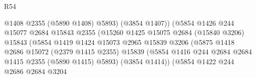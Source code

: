 \begin{lexlean}{R54}
\begin{coremodule}
                                              @1408
                                              @2355
                                              (@5890 @1408)
                                              @5893)
                                            (@3854 @1407))
                                          (@5854
                                            @1426
                                            @244
                                            @15077
                                            @2684
                                            @15843
                                            @2355
                                            (@15260
                                              @1425
                                              @15075
                                              @2684
                                              (@15840 @3206)
                                              @15843
                                              (@5854
                                                @1419
                                                @1424
                                                @15073
                                                @2965
                                                @15839
                                                @3206
                                                (@5875
                                                  @1418
                                                  @2686
                                                  @15072
                                                  (@2379 @1415 @2355)
                                                  @15839
                                                  (@5854
                                                    @1416
                                                    @244
                                                    @2684
                                                    @2684
                                                    @1415
                                                    @2355
                                                    (@5890 @1415)
                                                    @5893)
                                                  (@3854 @1414))
                                                (@5854
                                                  @1422
                                                  @244
                                                  @2686
                                                  @2684
                                                  @3204

\end{coremodule}
\end{lexlean}

